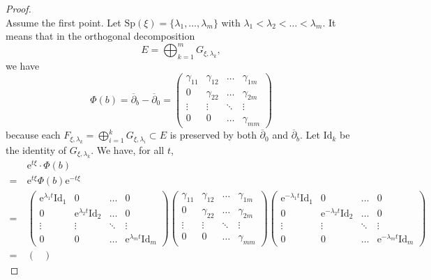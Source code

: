 \documentclass{article}
\theoremstyle{remark}
\theoremstyle{definition}
\newcommand{\Id}{\mathrm{Id}}
\newcommand{\e}{\boldsymbol{\mathrm{e}}}
\newcommand{\dbar}{\overline{\partial}}
\begin{document}
\begin{proof}\ \\
\noindent{} Assume the first point. Let $\mathrm{Sp}(\xi) = \{\lambda_1,\ldots,\lambda_m\}$ with $\lambda_1 < \lambda_2 < \ldots < \lambda_m$. It means that in the orthogonal decomposition
$$
E = \bigoplus_{k = 1}^m G_{\xi,\lambda_k},
$$
we have
$$
\Phi(b) = \dbar_b - \dbar_0 =
\begin{pmatrix}
    \gamma_{11} & \gamma_{12} & \hdots & \gamma_{1m}\\
    0 & \gamma_{22} & \hdots & \gamma_{2m}\\
    \vdots & \vdots & \ddots & \vdots\\
    0 & 0 & \hdots & \gamma_{mm}
\end{pmatrix}
$$
because each $F_{\xi,\lambda_k} = \bigoplus_{i = 1}^k G_{\xi,\lambda_i} \subset E$ is preserved by both $\dbar_0$ and $\dbar_b$. Let $\Id_k$ be the identity of $G_{\xi,\lambda_k}$. We have, for all $t$,
\begin{align*}
    &\e^{t\xi} \cdot \Phi(b)\\
    =\ & \e^{t\xi}\Phi(b)\e^{-t\xi}\\
    =\ &
    \begin{pmatrix}
        \e^{\lambda_1t}\Id_1 & 0 & \hdots & 0\\
        0 & \e^{\lambda_2t}\Id_2 & \hdots & 0\\
        \vdots & \vdots & \ddots & \vdots\\
        0 & 0 & \hdots & \e^{\lambda_mt}\Id_m
    \end{pmatrix}
    \begin{pmatrix}
        \gamma_{11} & \gamma_{12} & \hdots & \gamma_{1m}\\
        0 & \gamma_{22} & \hdots & \gamma_{2m}\\
        \vdots & \vdots & \ddots & \vdots\\
        0 & 0 & \hdots & \gamma_{mm}
    \end{pmatrix}
    \begin{pmatrix}
        \e^{-\lambda_1t}\Id_1 & 0 & \hdots & 0\\
        0 & \e^{-\lambda_2t}\Id_2 & \hdots & 0\\
        \vdots & \vdots & \ddots & \vdots\\
        0 & 0 & \hdots & \e^{-\lambda_mt}\Id_m
    \end{pmatrix}\\
    =\ &
    \begin{pmatrix}

\end{pmatrix}
\end{align*}
\end{proof}
\end{document}
